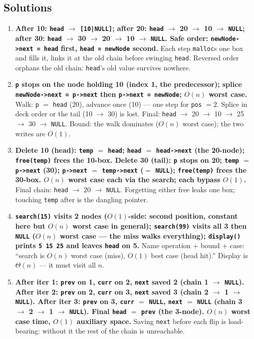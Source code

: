 \documentclass[11pt]{article}
\begin{document}
\subsection*{Solutions}

\begingroup\small
\begin{enumerate}
  \item \textbf{After 10: \texttt{head} $\to$ \texttt{[10|NULL]}; after 20: \texttt{head} $\to$ 20 $\to$ 10 $\to$ \texttt{NULL}; after 30: \texttt{head} $\to$ 30 $\to$ 20 $\to$ 10 $\to$ \texttt{NULL}. Safe order: \texttt{newNode->next = head} first, \texttt{head = newNode} second.} Each step \texttt{malloc}s one box and fills it, links it at the old chain before swinging \texttt{head}. Reversed order orphans the old chain: \texttt{head}'s old value survives nowhere.
  \item \textbf{\texttt{p} stops on the node holding 10 (index 1, the predecessor); splice \texttt{newNode->next = p->next} then \texttt{p->next = newNode}; $O(n)$ worst case.} Walk: \texttt{p} $=$ \texttt{head} (20), advance once (10) --- one step for \texttt{pos} $= 2$. Splice in deck order or the tail (10 $\to$ 30) is lost. Final: \texttt{head} $\to$ 20 $\to$ 10 $\to$ 25 $\to$ 30 $\to$ \texttt{NULL}. Bound: the walk dominates ($O(n)$ worst case); the two writes are $O(1)$.
  \item \textbf{Delete 10 (head): \texttt{temp} $=$ \texttt{head}; \texttt{head} $=$ \texttt{head->next} (the 20-node); \texttt{free(temp)} frees the 10-box. Delete 30 (tail): \texttt{p} stops on 20; \texttt{temp} $=$ \texttt{p->next} (30); \texttt{p->next} $=$ \texttt{temp->next} ($=$ \texttt{NULL}); \texttt{free(temp)} frees the 30-box. $O(n)$ worst case each via the search; each bypass $O(1)$.} Final chain: \texttt{head} $\to$ 20 $\to$ \texttt{NULL}. Forgetting either free leaks one box; touching \texttt{temp} after is the dangling pointer.
  \item \textbf{\texttt{search(15)} visits 2 nodes ($O(1)$-side: second position, constant here but $O(n)$ worst case in general); \texttt{search(99)} visits all 3 then \texttt{NULL} ($O(n)$ worst case --- the miss walks everything); \texttt{display()} prints \texttt{5 15 25} and leaves \texttt{head} on 5.} Name operation $+$ bound $+$ case: ``search is $O(n)$ worst case (miss), $O(1)$ best case (head hit).'' Display is $\Theta(n)$ --- it must visit all $n$.
  \item \textbf{After iter 1: \texttt{prev} on 1, \texttt{curr} on 2, \texttt{next} saved 2 (chain 1 $\to$ \texttt{NULL}). After iter 2: \texttt{prev} on 2, \texttt{curr} on 3, \texttt{next} saved 3 (chain 2 $\to$ 1 $\to$ \texttt{NULL}). After iter 3: \texttt{prev} on 3, \texttt{curr} $=$ \texttt{NULL}, \texttt{next} $=$ \texttt{NULL} (chain 3 $\to$ 2 $\to$ 1 $\to$ \texttt{NULL}). Final \texttt{head} $=$ \texttt{prev} (the 3-node). $O(n)$ worst case time, $O(1)$ auxiliary space.} Saving \texttt{next} before each flip is load-bearing: without it the rest of the chain is unreachable.
\end{enumerate}
\endgroup



\end{document}
